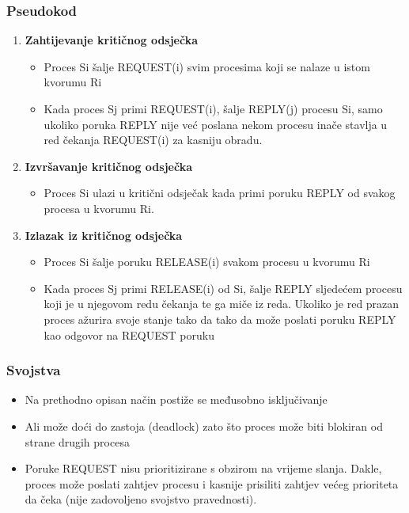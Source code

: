 \documentclass[11pt]{beamer}
\begin{document}
\begin{frame}
	\frametitle{Pseudokod}
	\begin{enumerate}
		\item \textbf{Zahtijevanje kritičnog odsječka}
		\begin{itemize}
			\item Proces Si šalje REQUEST(i) svim procesima koji se nalaze u istom kvorumu Ri
			\item  Kada proces Sj primi REQUEST(i), šalje REPLY(j) procesu Si, samo ukoliko poruka REPLY nije već poslana nekom procesu inače stavlja u red čekanja REQUEST(i) za kasniju obradu.
		\end{itemize}
		
		\item \textbf{Izvršavanje kritičnog odsječka}
		\begin{itemize}
			\item  Proces Si ulazi u kritični odsječak kada primi poruku REPLY od svakog procesa u kvorumu Ri.
		\end{itemize}
		
		
		\item \textbf{Izlazak iz kritičnog odsječka}
		\begin{itemize}
			\item Proces Si šalje poruku RELEASE(i) svakom procesu u kvorumu Ri
			\item Kada proces Sj primi RELEASE(i) od Si, šalje REPLY sljedećem procesu koji je u njegovom redu čekanja te ga miče iz reda. 
			Ukoliko je red prazan proces ažurira svoje stanje tako da tako da može poslati poruku REPLY kao odgovor na REQUEST poruku
		\end{itemize}
	\end{enumerate}
\end{frame}

\begin{frame}
	\frametitle{Svojstva}
	\begin{itemize}
		\item Na prethodno opisan način postiže se međusobno isključivanje
		\item Ali može doći do zastoja (deadlock) zato što proces može biti blokiran od strane drugih procesa
		\item Poruke REQUEST nisu prioritizirane s obzirom na vrijeme slanja. Dakle, proces može poslati zahtjev procesu i kasnije prisiliti zahtjev većeg prioriteta da čeka (nije zadovoljeno svojstvo pravednosti). 
	\end{itemize}
\end{frame}
\end{document}
